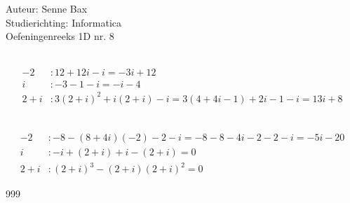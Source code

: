 \documentclass[a4paper]{article}
\begin{document}
  
\noindent \large Auteur: Senne Bax \\
\noindent \large Studierichting: Informatica\\
\noindent \large Oefeningenreeks 1D nr. 8\\

\medskip

\normalsize

\\

\begin{align*}
-2    & :  12 + 12i - i = \boxed{-3i+12} \\
i     & :  -3 - 1 - i = \boxed{-i-4} \\
2+i   & :  3(2+i)^2 + i(2+i) -i = 3(4+4i-1) + 2i - 1 - i = \boxed{13i+8}
\end{align*}

\\

\begin{align*}
-2    & :  -8 - (8 + 4i)(-2) - 2 - i = -8 -8 -4i -2 -2 - i= \boxed{-5i - 20} \\
i     & :  -i + (2+i) + i - (2+i) = \boxed{0} \\
2+i   & :  (2+i)^3 - (2+i)(2+i)^2 = \boxed{0}
\end{align*}

\begin{thebibliography}{999}
\end{thebibliography}
\end{document}
